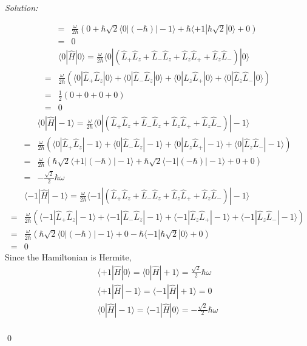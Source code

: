 \documentclass[12pt,a4paper]{article}
\newenvironment{sol}
    {\emph{Solution:}
    }
    {
    \qed
    }
\begin{document}
\begin{sol}
\begin{itemize}
\begin{align}
\nonumber=&\frac{\omega}{2\hbar}(0+\hbar\sqrt{2}\langle0|(-\hbar)|-1\rangle+\hbar\langle+1|\hbar\sqrt{2}|0\rangle+0)\\
=&0
\end{align}
\begin{align}
\nonumber&\langle0|\hat{H}|0\rangle=\frac{\omega}{2\hbar}\langle0|(\hat{L}_+\hat{L}_z+\hat{L}_-\hat{L}_z+\hat{L}_z\hat{L}_++\hat{L}_z\hat{L}_-)|0\rangle\\
\nonumber=&\frac{\omega}{2\hbar}(\langle0|\hat{L}_+\hat{L}_z|0\rangle+\langle0|\hat{L}_-\hat{L}_z|0\rangle+\langle0|\hat{L}_z\hat{L}_+|0\rangle+\langle0|\hat{L}_z\hat{L}_-|0\rangle)\\
\nonumber=&\frac{1}{2}(0+0+0+0)\\
=&0
\end{align}
\begin{align}
\nonumber&\langle0|\hat{H}|-1\rangle=\frac{\omega}{2\hbar}\langle0|(\hat{L}_+\hat{L}_z+\hat{L}_-\hat{L}_z+\hat{L}_z\hat{L}_++\hat{L}_z\hat{L}_-)|-1\rangle\\
\nonumber=&\frac{\omega}{2\hbar}(\langle0|\hat{L}_+\hat{L}_z|-1\rangle+\langle0|\hat{L}_-\hat{L}_z|-1\rangle+\langle0|\hat{L}_z\hat{L}_+|-1\rangle+\langle0|\hat{L}_z\hat{L}_-|-1\rangle)\\
\nonumber=&\frac{\omega}{2\hbar}(\hbar\sqrt{2}\langle+1|(-\hbar)|-1\rangle+\hbar\sqrt{2}\langle-1|(-\hbar)|-1\rangle+0+0)\\
=&-\frac{\sqrt{2}}{2}\hbar\omega
\end{align}
\begin{align}
\nonumber&\langle-1|\hat{H}|-1\rangle=\frac{\omega}{2\hbar}\langle-1|(\hat{L}_+\hat{L}_z+\hat{L}_-\hat{L}_z+\hat{L}_z\hat{L}_++\hat{L}_z\hat{L}_-)|-1\rangle\\
\nonumber=&\frac{\omega}{2\hbar}(\langle-1|\hat{L}_+\hat{L}_z|-1\rangle+\langle-1|\hat{L}_-\hat{L}_z|-1\rangle+\langle-1|\hat{L}_z\hat{L}_+|-1\rangle+\langle-1|\hat{L}_z\hat{L}_-|-1\rangle)\\
\nonumber=&\frac{\omega}{2\hbar}(\hbar\sqrt{2}\langle0|(-\hbar)|-1\rangle+0-\hbar\langle-1|\hbar\sqrt{2}|0\rangle+0)\\
=&0
\end{align}
Since the Hamiltonian is Hermite,
\begin{gather}
\langle+1|\hat{H}|0\rangle=\langle0|\hat{H}|+1\rangle=\frac{\sqrt{2}}{2}\hbar\omega\\
\langle+1|\hat{H}|-1\rangle=\langle-1|\hat{H}|+1\rangle=0\\
\langle0|\hat{H}|-1\rangle=\langle-1|\hat{H}|0\rangle=-\frac{\sqrt{2}}{2}\hbar\omega\\

\end{gather}
\end{itemize}
\end{sol}
\end{document}
